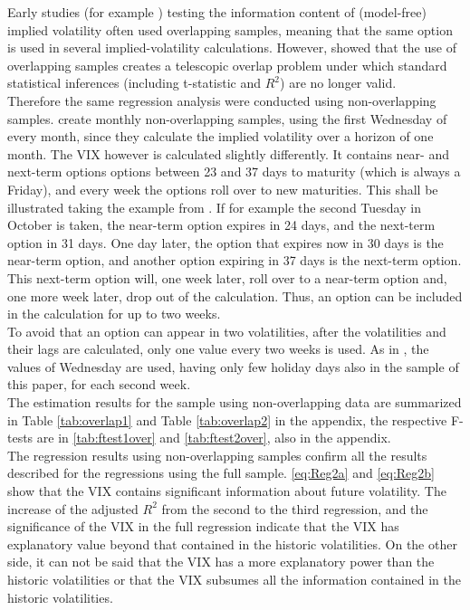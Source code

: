 Early studies (for example \textcite{canina1993}) testing the information content of (model-free) implied volatility often used overlapping samples, meaning that the same option is used in several implied-volatility calculations. However, \textcite{christensen2001} showed that the use of overlapping samples creates a telescopic overlap problem under which standard statistical inferences (including t-statistic and $R^{2}$) are no longer valid.\\
Therefore the same regression analysis were conducted using non-overlapping samples. \textcite{jiang2003} create monthly non-overlapping samples, using the first Wednesday of every month, since they calculate the implied volatility over a horizon of one month. The VIX however is calculated slightly differently. It contains near- and next-term options options between 23 and 37 days to maturity (which is always a Friday), and every week the options roll over to new maturities. This shall be illustrated taking the example from \textcite{exchange2009}. If for example the second Tuesday in October is taken, the near-term option expires in 24 days, and the next-term option in 31 days. One day later, the option that expires now in 30 days is the near-term option, and another option expiring in 37 days is the next-term option. This next-term option will, one week later, roll over to a near-term option and, one more week later, drop out of the calculation. Thus, an option can be included in the calculation for up to two weeks. \\
To avoid that an option can appear in two volatilities, after the volatilities and their lags are calculated, only one value every two weeks is used. As in \textcite{jiang2003}, the values of Wednesday are used, having only few holiday days also in the sample of this paper, for each second week.\\
The estimation results for the sample using non-overlapping data are summarized in Table \ref{tab:overlap1} and Table \ref{tab:overlap2} in the appendix, the respective F-tests are in \ref{tab:ftest1over} and \ref{tab:ftest2over}, also in the appendix.\\
The regression results using non-overlapping samples confirm all the results described for the regressions using the full sample. \ref{eq:Reg2a} and \ref{eq:Reg2b} show that the VIX contains significant information about future volatility. The increase of the adjusted $R^{2}$ from the second to the third regression, and the significance of the VIX in the full regression indicate that the VIX has explanatory value beyond that contained in the historic volatilities. On the other side, it can not be said that the VIX has a more explanatory power than the historic volatilities or that the VIX subsumes all the information contained in the historic volatilities.\\
